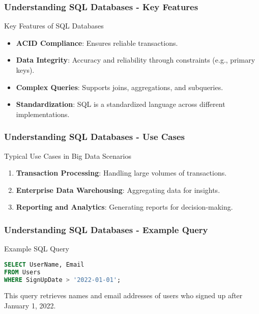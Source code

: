 \documentclass[aspectratio=169]{beamer}
\begin{document}
\begin{frame}[fragile]
    \frametitle{Understanding SQL Databases - Key Features}
    \begin{block}{Key Features of SQL Databases}
        \begin{itemize}
            \item \textbf{ACID Compliance}: Ensures reliable transactions.
            \item \textbf{Data Integrity}: Accuracy and reliability through constraints (e.g., primary keys).
            \item \textbf{Complex Queries}: Supports joins, aggregations, and subqueries.
            \item \textbf{Standardization}: SQL is a standardized language across different implementations.
        \end{itemize}
    \end{block}
\end{frame}

\begin{frame}[fragile]
    \frametitle{Understanding SQL Databases - Use Cases}
    \begin{block}{Typical Use Cases in Big Data Scenarios}
        \begin{enumerate}
            \item \textbf{Transaction Processing}: Handling large volumes of transactions.
            \item \textbf{Enterprise Data Warehousing}: Aggregating data for insights.
            \item \textbf{Reporting and Analytics}: Generating reports for decision-making.
        \end{enumerate}
    \end{block}
\end{frame}

\begin{frame}[fragile]
    \frametitle{Understanding SQL Databases - Example Query}
    \begin{block}{Example SQL Query}
    \begin{lstlisting}[language=SQL]
SELECT UserName, Email 
FROM Users 
WHERE SignUpDate > '2022-01-01';
    \end{lstlisting}
    This query retrieves names and email addresses of users who signed up after January 1, 2022.
    \end{block}
\end{frame}
\end{document}
